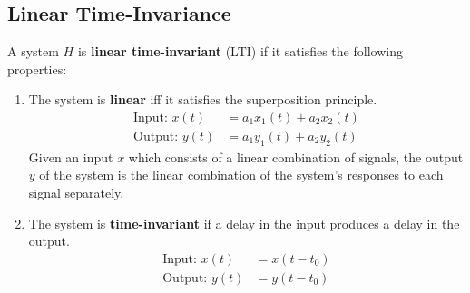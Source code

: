 \documentclass{article}
\begin{document}
\subsection{Linear Time-Invariance}
A system \(H\) is \textbf{linear time-invariant} (LTI) if it satisfies the following properties:
\begin{enumerate}
    \item The system is \textbf{linear} iff it satisfies the superposition principle.
          \begin{align*}
              \text{Input: } x\left( t \right)  & = a_1 x_1\left( t \right) + a_2 x_2\left( t \right) \\
              \text{Output: } y\left( t \right) & = a_1 y_1\left( t \right) + a_2 y_2\left( t \right)
          \end{align*}
          Given an input \(x\) which consists of a linear combination of signals,
          the output \(y\) of the system is the linear combination of the system's responses to each signal separately.
    \item The system is \textbf{time-invariant} if a delay in the input produces a delay in the output.
          \begin{align*}
              \text{Input: } x\left( t \right)  & = x\left( t - t_0 \right) \\
              \text{Output: } y\left( t \right) & = y\left( t - t_0 \right)
          \end{align*}
\end{enumerate}
\end{document}

